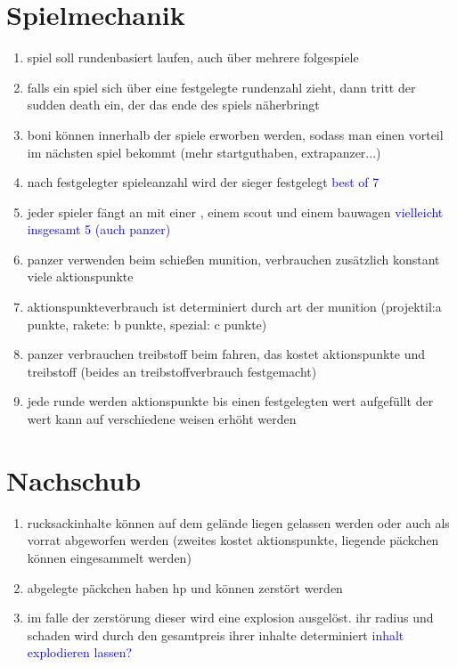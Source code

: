 \documentclass[10pt,a4paper,final]{scrartcl}
\newcommand{\raus}[1]{\xout{#1}}
\newcommand{\notiz}[1]{\textcolor{blue}{#1}}
\begin{document}
\tableofcontents
\cleardoublepage

\section{Spielmechanik}
\begin{enumerate}
\item spiel soll rundenbasiert laufen, auch über mehrere folgespiele
\item falls ein spiel sich über eine festgelegte rundenzahl zieht, dann tritt der sudden death ein, 
der das ende des spiels näherbringt
\item boni können innerhalb der spiele erworben werden, sodass man einen vorteil im nächsten spiel bekommt
(mehr startguthaben, extrapanzer...)
\item nach festgelegter spieleanzahl wird der sieger festgelegt \notiz{best of 7}
\item jeder spieler fängt an mit einer \raus{citadella}, einem scout und einem bauwagen \notiz{vielleicht insgesamt 5 (auch panzer)}
\item panzer verwenden beim schießen munition, verbrauchen zusätzlich konstant viele aktionspunkte 
\item aktionspunkteverbrauch ist determiniert durch art der munition 
(projektil:a punkte, rakete: b punkte, spezial: c punkte)
\item panzer verbrauchen treibstoff beim fahren, das kostet aktionspunkte und treibstoff
(beides an treibstoffverbrauch festgemacht)
\item jede runde werden aktionspunkte bis einen festgelegten wert aufgefüllt 
der wert kann auf verschiedene weisen erhöht werden
\end{enumerate}

\section{Nachschub}
\begin{enumerate}
\item rucksackinhalte können auf dem gelände liegen gelassen werden oder auch als vorrat abgeworfen werden
(zweites kostet aktionspunkte, liegende päckchen können eingesammelt werden)
\item abgelegte päckchen haben hp und können zerstört werden
\item im falle der zerstörung dieser wird eine explosion ausgelöst. ihr radius und schaden wird durch den 
gesamtpreis ihrer inhalte determiniert \notiz{inhalt explodieren lassen?}
\end{enumerate}
\end{document}
